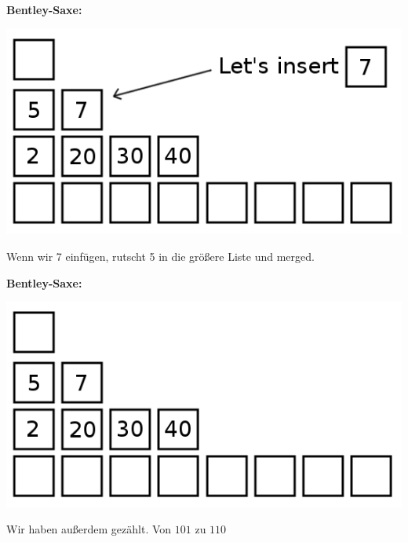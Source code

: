 \documentclass{beamer}
\begin{document}

\begin{frame}
\textbf{Bentley-Saxe:}
\begin{center}
\includegraphics[scale=0.5]{bentley_saxe_02.png} 
\end{center}

Wenn wir 7 einfügen, rutscht 5 in die größere Liste und merged.
\end{frame}


\begin{frame}
\textbf{Bentley-Saxe:}
\begin{center}
\includegraphics[scale=0.5]{bentley_saxe_03.png} 
\end{center}

Wir haben außerdem \glqq gezählt\grqq . Von $101$ zu $110$ 
\end{frame}

\end{document}
